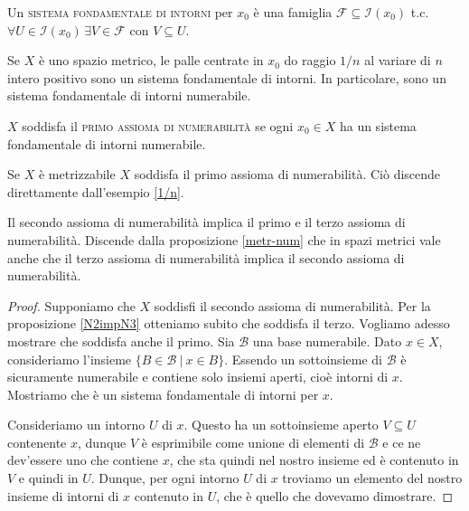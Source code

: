 \documentclass{article}
\begin{document}
\begin{defn}
	Un \textsc{sistema fondamentale di intorni} per $x_0$ è una famiglia
	$\mathcal{F} \subseteq \mathcal{I}(x_0)$ t.c. $\forall U \in
	\mathcal{I}(x_0) \, \exists V \in \mathcal{F}$ con $V \subseteq U$.
\end{defn}

\begin{ex} \label{1/n}
	Se $X$ è uno spazio metrico, le palle centrate in $x_0$ do raggio $1/n$ al
	variare di $n$ intero positivo sono un sistema fondamentale di intorni. In
	particolare, sono un sistema fondamentale di intorni numerabile.
\end{ex}

\begin{defn} \label{N1}
	$X$ soddisfa il \textsc{primo assioma di numerabilità} se ogni $x_0 \in X$
	ha un sistema fondamentale di intorni numerabile.
\end{defn}

\begin{ftt}
	Se $X$ è metrizzabile $X$ soddisfa il primo assioma di numerabilità. Ciò
	discende direttamente dall'esempio \ref{1/n}.
\end{ftt}

\begin{prop}
	Il secondo assioma di numerabilità implica il primo e il terzo assioma di
	numerabilità. Discende dalla proposizione \ref{metr-num} che in spazi
	metrici vale anche che il terzo assioma di numerabilità implica il secondo
	assioma di numerabilità.
\end{prop}

\begin{proof}
	Supponiamo che $X$ soddisfi il secondo assioma di numerabilità. Per la
	proposizione \ref{N2impN3} otteniamo subito che soddisfa il terzo. Vogliamo
	adesso mostrare che soddisfa anche il primo. Sia $\mathcal{B}$ una base
	numerabile. Dato $x \in X$, consideriamo l'insieme ${\{ B \in \mathcal{B}\
	|\ x \in B \}}$. Essendo un sottoinsieme di $\mathcal{B}$ è sicuramente
	numerabile e contiene solo insiemi aperti, cioè intorni di $x$. Mostriamo
	che è un sistema fondamentale di intorni per $x$.

	Consideriamo un intorno $U$ di $x$. Questo ha un sottoinsieme aperto $V
	\subseteq U$ contenente $x$, dunque $V$ è esprimibile come unione di
	elementi di $\mathcal{B}$ e ce ne dev'essere uno che contiene $x$, che sta
	quindi nel nostro insieme ed è contenuto in $V$ e quindi in $U$. Dunque, per
	ogni intorno $U$ di $x$ troviamo un elemento del nostro insieme di intorni
	di $x$ contenuto in $U$, che è quello che dovevamo dimostrare.
\end{proof}
\end{document}
